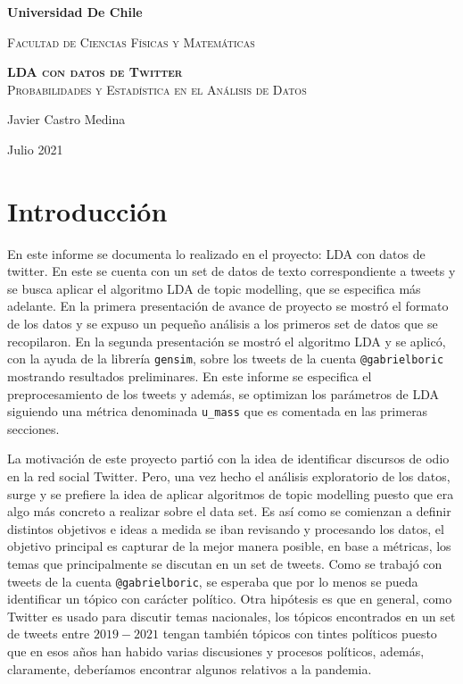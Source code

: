 \documentclass{article}
\begin{document}


\begin{titlepage}
	\centering
	{\bfseries\LARGE Universidad De Chile \par}
	\vspace{1cm}
	{\scshape\Large Facultad de Ciencias Físicas y Matemáticas \par}
	\vspace{3cm}
	{\scshape{\Huge \textbf{LDA con datos de Twitter}}\\
		Probabilidades y Estadística en el Análisis de Datos \par}
	\vfill
	{\Large  Javier Castro Medina\par}

	\vfill
	{\Large Julio 2021 \par}
\end{titlepage}
\newpage
\section{Introducción}
En este informe se documenta lo realizado en el proyecto: LDA con datos de twitter. En este se cuenta con un set de datos de texto correspondiente a tweets y se busca aplicar el algoritmo LDA de topic modelling, que se especifica más adelante. En la primera presentación de avance de proyecto se mostró el formato de los datos y se expuso un pequeño análisis a los primeros set de datos que se recopilaron. En la segunda presentación se mostró el algoritmo LDA y se aplicó, con la ayuda de la librería \texttt{gensim}, sobre los tweets de la cuenta \texttt{@gabrielboric} mostrando resultados preliminares. En este informe se especifica el preprocesamiento de los tweets y además, se optimizan los parámetros de LDA siguiendo una métrica denominada \texttt{u\_mass} que es comentada en las primeras secciones. 

La motivación de este proyecto partió con la idea de identificar discursos de odio en la red social Twitter. Pero, una vez hecho el análisis exploratorio de los datos, surge y se prefiere la idea de aplicar algoritmos de topic modelling puesto que era algo más concreto a realizar sobre el data set. Es así como se comienzan a definir distintos objetivos e ideas a medida se iban revisando y procesando los datos, el objetivo principal es capturar de la mejor manera posible, en base a métricas, los temas que principalmente se discutan en un set de tweets. Como se trabajó con tweets de la cuenta \texttt{@gabrielboric}, se esperaba que por lo menos se pueda identificar un tópico con carácter político. Otra hipótesis es que en general, como Twitter es usado para discutir temas nacionales, los tópicos encontrados en un set de tweets entre $2019-2021$ tengan también tópicos con tintes políticos puesto que en esos años han habido varias discusiones y procesos políticos, además, claramente, deberíamos encontrar algunos relativos a la pandemia.
\end{document}
